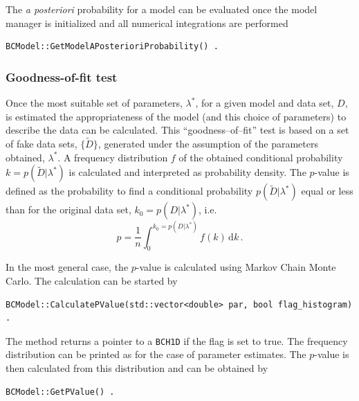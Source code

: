 \documentclass[11pt, a4paper]{article}
\begin{document}
\noindent 
The {\it a posteriori} probability for a model can be evaluated once
the model manager is initialized and all numerical integrations are
performed
%
\begin{verbatim}
BCModel::GetModelAPosterioriProbability() . 
\end{verbatim}


\subsubsection{Goodness-of-fit test} 

Once the most suitable set of parameters, $\lambda^{*}$, for a given
model and data set, $D$, is estimated the appropriateness of the model
(and this choice of parameters) to describe the data can be
calculated. This ``goodness--of--fit'' test is based on a set of fake
data sets, $\{ \tilde{D} \}$, generated under the assumption of the
parameters obtained, $\lambda^{*}$. A frequency distribution $f$ of
the obtained conditional probability $k=p(\tilde{D}|\lambda^{*})$ is
calculated and interpreted as probability density. The $p$-value is
defined as the probability to find a conditional probability
$p(\tilde{D}|\lambda^{*})$ equal or less than for the original data
set, $k_{0}=p(D|\lambda^{*})$, i.e.
%
\begin{equation}
p = \frac{1}{n} \int_{0}^{k_{0}=p(D|\lambda^{*})} f(k) \, \mathrm{d}k \, . 
\end{equation} 

\noindent 
In the most general case, the $p$-value is calculated using Markov
Chain Monte Carlo. The calculation can be started by 
%
\begin{verbatim}
BCModel::CalculatePValue(std::vector<double> par, bool flag_histogram) . 
\end{verbatim}
%
\noindent 
The method returns a pointer to a \verb|BCH1D| if the flag is set to
true. The frequency distribution can be printed as for the case of
parameter estimates. The $p$-value is then calculated from this
distribution and can be obtained by
%
\begin{verbatim}
BCModel::GetPValue() . 
\end{verbatim} 

\end{document}
